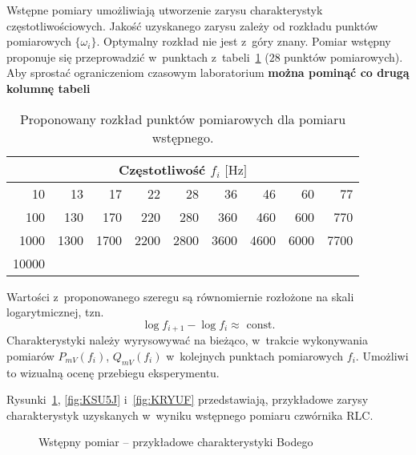 \documentclass[paper=a4,DIV=12]{lpas}
\begin{document}
\begin{appendices}
  Wstępne pomiary umożliwiają utworzenie zarysu charakterystyk
  częstotliwościowych. Jakość uzyskanego zarysu zależy od rozkładu punktów
  pomiarowych $\{\omega_i\}$. Optymalny rozkład nie jest z~góry znany. Pomiar
  wstępny proponuje się przeprowadzić w~punktach z~tabeli~\ref{tab:D3Y3O} ($28$
  punktów pomiarowych). Aby sprostać ograniczeniom czasowym laboratorium
  \textbf{można pominąć co drugą kolumnę tabeli}
  \begin{table}[H]
    \centering
    \begin{tabular}{|r|r|r|r|r|r|r|r|r|}
      \hline
      \multicolumn{9}{|c|}{Częstotliwość $f_i\text{ [Hz]}$} \\
      \hline\hline
      10 &    13 &    17 &    22 &    28 &    36 &    46 &    60 &    77 \\
      100 &   130 &   170 &   220 &   280 &   360 &   460 &   600 &   770 \\
      1000 &  1300 &  1700 &  2200 &  2800 &  3600 &  4600 &  6000 &  7700 \\
      10000 &       &       &       &       &       &       &       & \\\hline
    \end{tabular}
    \caption{Proponowany rozkład punktów pomiarowych dla pomiaru wstępnego.}
    \label{tab:D3Y3O}
  \end{table}
  Wartości z~proponowanego szeregu są równomiernie rozłożone na skali
  logarytmicznej, tzn.
  \begin{equation}
    \log{f_{i+1}} - \log{f_i} \approx \text{ const}.
    \label{eq:I4BBA}
  \end{equation}
  Charakterystyki należy wyrysowywać na bieżąco, w~trakcie wykonywania pomiarów
  $P_{mV}(f_i)$, $Q_{mV}(f_i)$ w~kolejnych punktach pomiarowych $f_i$. Umożliwi
  to wizualną ocenę przebiegu eksperymentu.

  Rysunki~\ref{fig:P2GUQ}, \ref{fig:KSU5J} i~\ref{fig:KRYUF} przedstawiają,
  przykładowe zarysy charakterystyk uzyskanych w~wyniku wstępnego pomiaru
  czwórnika RLC.
  \begin{figure}[H]
    \centering
    
    \caption{Wstępny pomiar -- przykładowe charakterystyki Bodego}
    \label{fig:P2GUQ}
  \end{figure}


\end{appendices}
\end{document}
